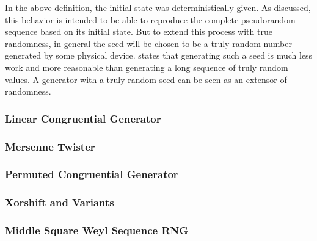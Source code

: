 \documentclass{stdlocal}
\begin{document}
    In the above definition, the initial state was deterministically given.
    As discussed, this behavior is intended to be able to reproduce the complete pseudorandom sequence based on its initial state.
    But to extend this process with true randomness, in general the seed will be chosen to be a truly random number generated by some physical device.
    \textcite{lecuyer1994} states that generating such a seed is much less work and more reasonable than generating a long sequence of truly random values.
    A generator with a truly random seed can be seen as an extensor of randomness.



    \subsubsection*{Linear Congruential Generator} %
    \label{ssub:linear_congruential_generator}


    \subsubsection*{Mersenne Twister} %
    \label{ssub:mersenne_twister}


    \subsubsection*{Permuted Congruential Generator} %
    \label{ssub:permuted_congruential_generator}


    \subsubsection*{Xorshift and Variants} %
    \label{ssub:xorshift_and_variants}


    \subsubsection*{Middle Square Weyl Sequence RNG} %
    \label{ssub:middle_square_weyl_sequence_rng}
\end{document}
